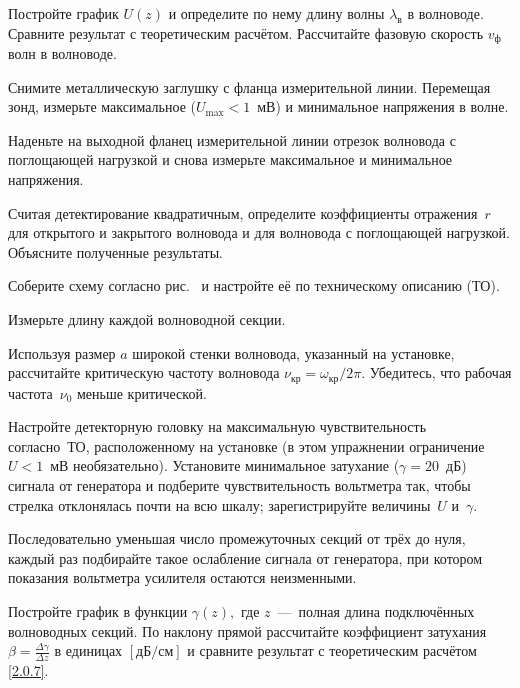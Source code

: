 \begin{lab:task}
    \item Постройте график $U(z)$ и определите по нему длину волны
    $\lambda_{\text{в}}$ в волноводе. Сравните результат с теоретическим расчётом.
    Рассчитайте фазовую скорость $v_{\text{ф}}$ волн в волноводе. 
    
    
    \item Снимите металлическую заглушку с фланца измерительной линии. Перемещая
    зонд, измерьте максимальное ($U_{\text{max}}<1$~мВ) и минимальное напряжения
    в волне.
    
    \item Наденьте на выходной фланец измерительной линии отрезок волновода с
    поглощающей нагрузкой и снова измерьте максимальное и минимальное напряжения.
    
    \item Считая детектирование квадратичным, определите коэффициенты 
    отражения~$r$ для открытого и закрытого волновода и для волновода 
    с поглощающей нагрузкой. Объясните полученные результаты.
    
    
    \item Соберите схему согласно рис.~ и настройте её по
    техническому описанию (ТО).
    
    \item Измерьте длину каждой волноводной секции.
    
    \item Используя размер $a$ широкой стенки волновода, указанный на установке,
    рассчитайте критическую частоту волновода $\nu_{кр}= \omega_{кр}/2\pi$. 
    Убедитесь, что рабочая частота~$\nu_0$ меньше критической.
    
    
    \item Настройте детекторную головку на максимальную чувствительность согласно~ТО, 
    расположенному на установке (в этом упражнении ограничение $U<1$~мВ
    необязательно). Установите минимальное затухание ($\gamma=20$~дБ) сигнала от
    генератора и подберите чувствительность вольтметра так, чтобы стрелка
    отклонялась почти на всю шкалу; зарегистрируйте величины~$U$ и~$\gamma$.
    
    \item Последовательно уменьшая число промежуточных секций от трёх до нуля,
    каждый раз подбирайте такое ослабление сигнала от генератора, при котором
    показания вольтметра усилителя остаются неизменными.
    
    \item Постройте график в функции $\gamma(z),$ где $z$~---~полная длина
    подключённых волноводных секций. По наклону прямой рассчитайте коэффициент
    затухания $\beta=\frac{\Delta\gamma}{\Delta z}$ 
    в единицах $[\text{дБ}/\text{см}]$ и сравните результат с теоретическим
    расчётом \eqref{2.0.7}.
 \end{lab:task}


